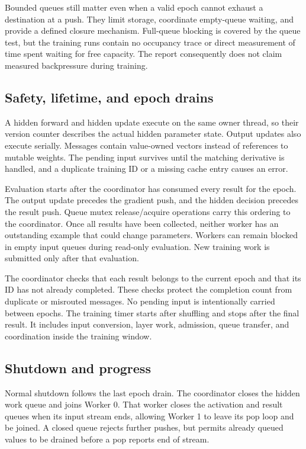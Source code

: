 \documentclass[conference]{IEEEtran}
\begin{document}
Bounded queues still matter even when a valid epoch cannot exhaust a destination at a push. They limit storage, coordinate empty-queue waiting, and provide a defined closure mechanism. Full-queue blocking is covered by the queue test, but the training runs contain no occupancy trace or direct measurement of time spent waiting for free capacity. The report consequently does not claim measured backpressure during training.

\subsection{Safety, lifetime, and epoch drains}
A hidden forward and hidden update execute on the same owner thread, so their version counter describes the actual hidden parameter state. Output updates also execute serially. Messages contain value-owned vectors instead of references to mutable weights. The pending input survives until the matching derivative is handled, and a duplicate training ID or a missing cache entry causes an error.

Evaluation starts after the coordinator has consumed every result for the epoch. The output update precedes the gradient push, and the hidden decision precedes the result push. Queue mutex release/acquire operations carry this ordering to the coordinator. Once all results have been collected, neither worker has an outstanding example that could change parameters. Workers can remain blocked in empty input queues during read-only evaluation. New training work is submitted only after that evaluation.

The coordinator checks that each result belongs to the current epoch and that its ID has not already completed. These checks protect the completion count from duplicate or misrouted messages. No pending input is intentionally carried between epochs. The training timer starts after shuffling and stops after the final result. It includes input conversion, layer work, admission, queue transfer, and coordination inside the training window.

\subsection{Shutdown and progress}
Normal shutdown follows the last epoch drain. The coordinator closes the hidden work queue and joins Worker 0. That worker closes the activation and result queues when its input stream ends, allowing Worker 1 to leave its pop loop and be joined. A closed queue rejects further pushes, but permits already queued values to be drained before a pop reports end of stream.
\end{document}
